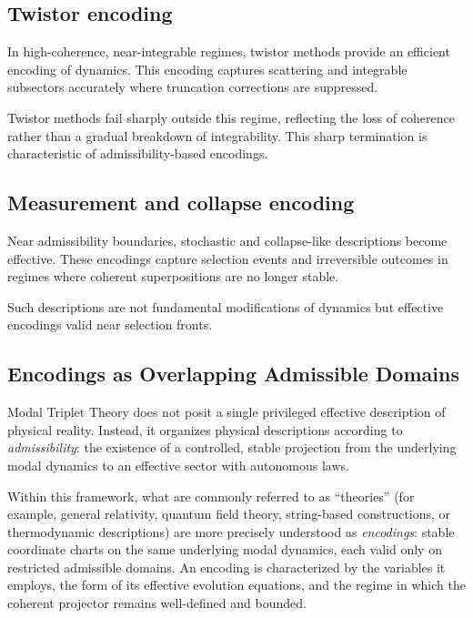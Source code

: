 \documentclass[11pt]{article}
\begin{document}
\subsection{Twistor encoding}

In high-coherence, near-integrable regimes, twistor methods provide an efficient encoding of dynamics. This encoding captures scattering and integrable subsectors accurately where truncation corrections are suppressed.

Twistor methods fail sharply outside this regime, reflecting the loss of coherence rather than a gradual breakdown of integrability. This sharp termination is characteristic of admissibility-based encodings.

\subsection{Measurement and collapse encoding}

Near admissibility boundaries, stochastic and collapse-like descriptions become effective. These encodings capture selection events and irreversible outcomes in regimes where coherent superpositions are no longer stable.

Such descriptions are not fundamental modifications of dynamics but effective encodings valid near selection fronts.

\subsection{Encodings as Overlapping Admissible Domains}
\label{sec:overlapping-encodings}

Modal Triplet Theory does not posit a single privileged effective description of physical
reality. Instead, it organizes physical descriptions according to \emph{admissibility}:
the existence of a controlled, stable projection from the underlying modal dynamics to an
effective sector with autonomous laws.

Within this framework, what are commonly referred to as ``theories'' (for example, general
relativity, quantum field theory, string-based constructions, or thermodynamic descriptions)
are more precisely understood as \emph{encodings}: stable coordinate charts on the same
underlying modal dynamics, each valid only on restricted admissible domains. An encoding is
characterized by the variables it employs, the form of its effective evolution equations, and
the regime in which the coherent projector remains well-defined and bounded.
\end{document}
